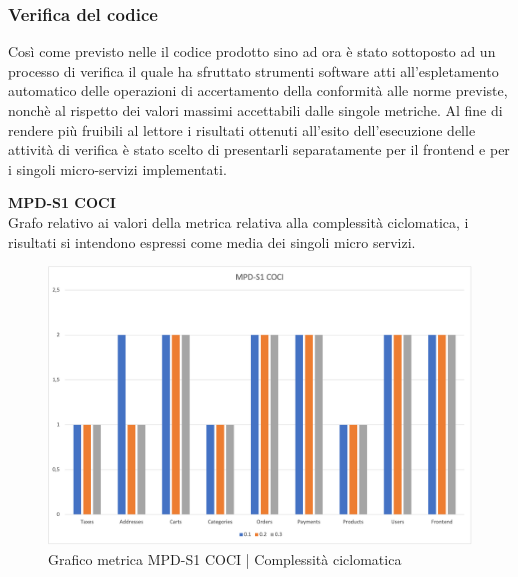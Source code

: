\subsubsection{Verifica del codice}
Così come previsto nelle  il codice prodotto sino ad ora è stato sottoposto ad un processo di verifica il quale 
ha sfruttato strumenti software atti all'espletamento automatico delle operazioni di accertamento della conformità alle norme previste, nonchè
al rispetto dei valori massimi accettabili dalle singole metriche.
Al fine di rendere più fruibili al lettore i risultati ottenuti all'esito dell'esecuzione delle attività di verifica è stato scelto di presentarli
separatamente per il frontend e per i singoli micro-servizi implementati.


\begin{center}
    \textbf{MPD-S1 COCI} \\
    Grafo relativo ai valori della metrica relativa alla complessità ciclomatica, i risultati si intendono espressi come media dei singoli
    micro servizi.
    \begin{figure}[!htb]
        \centering
        \includegraphics[scale=0.50]{res/images/RQcoci.png}
        \caption{Grafico metrica MPD-S1 COCI | Complessità ciclomatica}
    \end{figure}
    \begin{center}
        
    \end{center}


\end{center}
